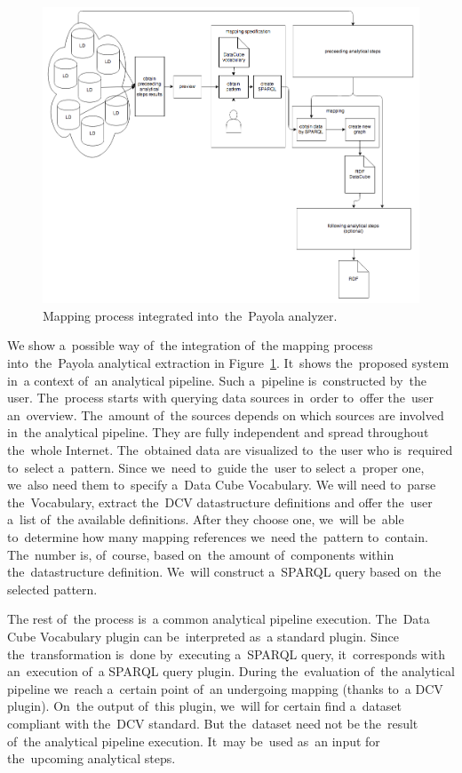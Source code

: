 \begin{figure}
	\centering
	\includegraphics[width=140mm]{img/payola-mapping.png}
	\caption{Mapping process integrated into~the~Payola analyzer.}
	\label{fig:payola-mapping}
\end{figure}

We show a~possible way of~the integration of~the mapping process into~the~Payola analytical extraction
in Figure~\ref{fig:payola-mapping}. It~shows the~proposed system in~a context of~an
analytical pipeline. Such a~pipeline is~constructed by~the user. The~process starts with querying data 
sources in~order to~offer the~user an~overview. The~amount of~the sources depends 
on which sources are involved in~the analytical pipeline. They are fully independent 
and spread throughout the~whole Internet. The~obtained data are visualized to~the user who is~required to~select a~pattern. Since we~need to~guide the~user 
to select a~proper one, we~also need them to~specify a~Data Cube Vocabulary. 
We will need to~parse the~Vocabulary, extract the~DCV datastructure definitions 
and offer the~user a~list of~the available definitions. After they choose one, we~will be~able to~determine how many mapping references we~need the~pattern to~contain. The~number is, of~course, based on~the amount of~components 
within the~datastructure definition. We~will construct a~SPARQL query based on~the selected pattern.

The rest of~the process is~a common analytical pipeline execution. The~Data Cube 
Vocabulary plugin can be~interpreted as~a standard plugin. Since the~transformation is~done by~executing a~SPARQL query, it~corresponds with an~execution of~a SPARQL query plugin. During the~evaluation of~the analytical pipeline we~reach a~certain point of~an undergoing mapping (thanks to~a DCV plugin). On~the output of~this plugin, we~will for certain find a~dataset compliant with the~DCV standard. But the~dataset need not 
be the~result of~the analytical pipeline execution. It~may be~used as~an input 
for the~upcoming analytical steps.

